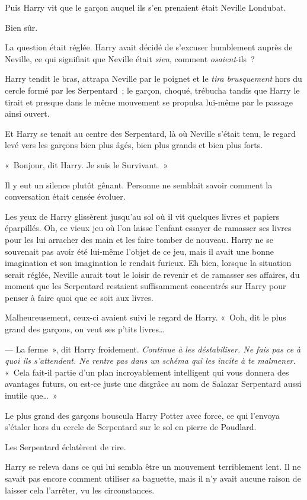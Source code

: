 Puis Harry vit que le garçon auquel ils s'en prenaient était Neville Londubat.

Bien sûr.

La question était réglée.
Harry avait décidé de s'excuser humblement auprès de Neville, ce qui signifiait que Neville était \emph{sien}, comment \emph{osaient}-ils~?

Harry tendit le bras, attrapa Neville par le poignet et le \emph{tira brusquement} hors du cercle formé par les Serpentard~; le garçon, choqué, trébucha tandis que Harry le tirait et presque dans le même mouvement se propulsa lui-même par le passage ainsi ouvert.

Et Harry se tenait au centre des Serpentard, là où Neville s'était tenu, le regard levé vers les garçons bien plus âgés, bien plus grands et bien plus forts.

«~Bonjour, dit Harry. Je suis le Survivant.~»

Il y eut un silence plutôt gênant.
Personne ne semblait savoir comment la conversation était censée évoluer.

Les yeux de Harry glissèrent jusqu'au sol où il vit quelques livres et papiers éparpillés.
Oh, ce vieux jeu où l'on laisse l'enfant essayer de ramasser ses livres pour les lui arracher des main et les faire tomber de nouveau.
Harry ne se souvenait pas avoir été lui-même l'objet de ce jeu, mais il avait une bonne imagination et son imagination le rendait furieux.
Eh bien, lorsque la situation serait réglée, Neville aurait tout le loisir de revenir et de ramasser ses affaires, du moment que les Serpentard restaient suffisamment concentrés sur Harry pour penser à faire quoi que ce soit aux livres.

Malheureusement, ceux-ci avaient suivi le regard de Harry.
«~Ooh, dit le plus grand des garçons, on veut ses p'tits livres…

--- La ferme~», dit Harry froidement.
\emph{Continue à les déstabiliser.
Ne fais pas ce à quoi ils s'attendent.
Ne rentre pas dans un schéma qui les incite à te malmener.}
«~Cela fait-il partie d'un plan incroyablement intelligent qui vous donnera des avantages futurs, ou est-ce juste une disgrâce au nom de Salazar Serpentard aussi inutile que…~»

Le plus grand des garçons bouscula Harry Potter avec force, ce qui l'envoya s'étaler hors du cercle de Serpentard sur le sol en pierre de Poudlard.

Les Serpentard éclatèrent de rire.

Harry se releva dans ce qui lui sembla être un mouvement terriblement lent.
Il ne savait pas encore comment utiliser sa baguette, mais il n'y avait aucune raison de laisser cela l'arrêter, vu les circonstances.


